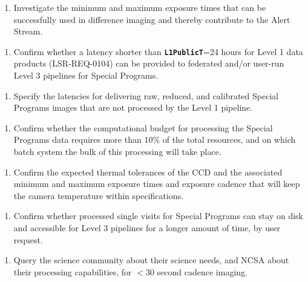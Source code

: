 \documentclass[DM,lsstdraft,toc]{lsstdoc}
\begin{document}
\begin{enumerate}[topsep=-10pt,label= \textbf{Concern \Roman*.}] \item \label{C1} Investigate the minimum and maximum exposure times that can be successfully used in difference imaging and thereby contribute to the Alert Stream. \end{enumerate}
\begin{enumerate}[resume,topsep=-10pt,label= \textbf{Concern \Roman*.}] \item \label{C2} Confirm whether a latency shorter than {\tt \textbf{L1PublicT}}=24 hours for Level 1 data products (LSR-REQ-0104) can be provided to federated and/or user-run Level 3 pipelines for Special Programs. \end{enumerate}
\begin{enumerate}[resume,topsep=-10pt,label= \textbf{Concern \Roman*.}] \item \label{C3} Specify the latencies for delivering raw, reduced, and calibrated Special Programs images that are not processed by the Level 1 pipeline. \end{enumerate}
\begin{enumerate}[resume,topsep=-10pt,label= \textbf{Concern \Roman*.}] \item \label{C4} Confirm whether the computational budget for processing the Special Programs data requires more than 10\% of the total resources, and on which batch system the bulk of this processing will take place. \end{enumerate}
\begin{enumerate}[resume,topsep=-10pt,label= \textbf{Concern \Roman*.}] \item \label{C5} Confirm the expected thermal tolerances of the CCD and the associated minimum and maximum exposure times and exposure cadence that will keep the camera temperature within specifications. \end{enumerate}
\begin{enumerate}[topsep=-10pt,label= \textbf{Concern \Roman*.},resume] \item \label{C6} Confirm whether processed single visits for Special Programs can stay on disk and accessible for Level 3 pipelines for a longer amount of time, by user request. \end{enumerate}
\begin{enumerate}[resume,topsep=-10pt,label= \textbf{Concern \Roman*.}] \item \label{C7} Query the science community about their science needs, and NCSA about their processing capabilities, for $<30$ second cadence imaging. \end{enumerate}
\end{document}
